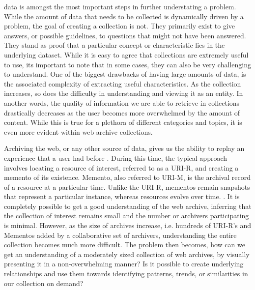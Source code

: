 \documentclass[10pt,journal,compsoc]{IEEEtran}
\begin{document}
 data is amongst the most important steps in further understating a problem. While the amount of data that needs to be collected is dynamically driven by a problem, the goal of creating a collection is not. They primarily exist to give answers, or possible guidelines, to questions that might not have been answered. They stand as proof that a particular concept or characteristic lies in the underlying dataset. While it is easy to agree that collections are extremely useful to use, its important to note that in some cases, they can also be very challenging to understand. One of the biggest drawbacks of having large amounts of data, is the associated complexity of extracting useful characteristics.  As the collection increases, so does the difficulty in understanding and viewing it as an entity. In another words, the quality of information we are able to retrieve in collections drastically decreases as the user becomes more overwhelmed by the amount of content. While this is true for a plethora of different categories and topics, it is even more evident within web archive collections. \par

Archiving the web, or any other source of data, gives us the ability to replay an experience that a user had before \cite{kelly2014archival}. During this time, the typical approach involves locating a resource of interest, referred to as a URI-R, and creating a memento of its existence. Memento, also referred to URI-M, is the archival record of a resource at a particular time. Unlike the URI-R, mementos remain snapshots that represent a particular instance, whereas resources evolve over time. \cite{van2009memento}. It is completely possible to get a good understanding of the web archive, inferring that the collection of interest remains small and the number or archivers participating is minimal. However, as the size of archives increase, i.e. hundreds of URI-R’s and Mementos added by a collaborative set of archivers, understanding the entire collection becomes much more difficult. The problem then becomes, how can we get an understanding of a moderately sized collection of web archives, by visually presenting it in a non-overwhelming manner? Is it possible to create underlying relationships and use them towards identifying patterns, trends, or similarities in our collection on demand? \par
\end{document}
